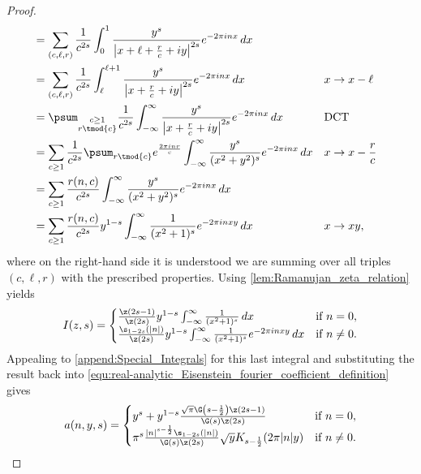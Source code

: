 \begin{proof}
\begin{align*}
          &= \sum_{(c,\ell,r)}\frac{1}{c^{2s}}\int_{0}^{1}\frac{y^{s}}{\left|x+\ell+\frac{r}{c}+iy\right|^{2s}}e^{-2\pi inx}\,dx \\
          &= \sum_{(c,\ell,r)}\frac{1}{c^{2s}}\int_{\ell}^{\ell+1}\frac{y^{s}}{\left|x+\frac{r}{c}+iy\right|^{2s}}e^{-2\pi inx}\,dx &&\text{$x \to x-\ell$} \\
          &= \psum_{\substack{c \ge 1 \\ r \tmod{c}}}\frac{1}{c^{2s}}\int_{-\infty}^{\infty}\frac{y^{s}}{\left|x+\frac{r}{c}+iy\right|^{2s}}e^{-2\pi inx}\,dx &&\text{DCT} \\
          &= \sum_{c \ge 1}\frac{1}{c^{2s}}\psum_{r \tmod{c}}e^{\frac{2\pi inr}{c}}\int_{-\infty}^{\infty}\frac{y^{s}}{(x^{2}+y^{2})^{s}}e^{-2\pi inx}\,dx &&\text{$x \to x-\frac{r}{c}$} \\
          &= \sum_{c \ge 1}\frac{r(n,c)}{c^{2s}}\int_{-\infty}^{\infty}\frac{y^{s}}{(x^{2}+y^{2})^{s}}e^{-2\pi inx}\,dx \\
          &= \sum_{c \ge 1}\frac{r(n,c)}{c^{2s}}y^{1-s}\int_{-\infty}^{\infty}\frac{1}{(x^{2}+1)^{s}}e^{-2\pi inxy}\,dx && \text{$x \to xy$},
        \end{align*}
        where on the right-hand side it is understood we are summing over all triples $(c,\ell,r)$ with the prescribed properties. Using \cref{lem:Ramanujan_zeta_relation} yields
        \[
          I(z,s) = \begin{cases} \frac{\z(2s-1)}{\z(2s)}y^{1-s}\int_{-\infty}^{\infty}\frac{1}{(x^{2}+1)^{s}}\,dx & \text{if $n = 0$}, \\ \frac{\s_{1-2s}(|n|)}{\z(2s)}y^{1-s}\int_{-\infty}^{\infty}\frac{1}{(x^{2}+1)^{s}}e^{-2\pi inxy}\,dx & \text{if $n \neq 0$}. \end{cases}
        \]
        Appealing to \cref{append:Special_Integrals} for this last integral and substituting the result back into \cref{equ:real-analytic_Eisenstein_fourier_coefficient_definition} gives
        \[
          a(n,y,s) = \begin{cases} y^{s}+y^{1-s}\frac{\sqrt{\pi}\G\left(s-\frac{1}{2}\right)\z(2s-1)}{\G(s)\z(2s)} & \text{if $n = 0$}, \\ \pi^{s}\frac{|n|^{s-\frac{1}{2}}\s_{1-2s}(|n|)}{\G(s)\z(2s)}\sqrt{y}K_{s-\frac{1}{2}}(2\pi|n|y) & \text{if $n \neq 0$}. \end{cases}
        \]
      \end{proof}

